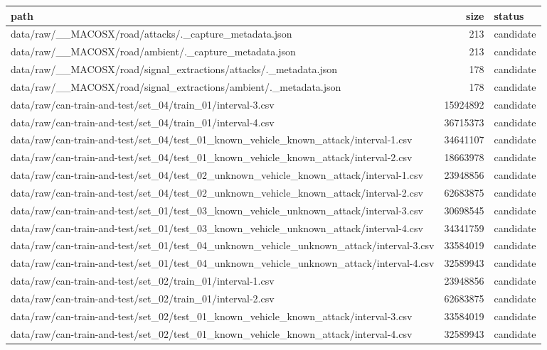 \begin{tabular}{lrl}
\toprule
path & size & status \\
\midrule
data/raw/\_\_MACOSX/road/attacks/.\_capture\_metadata.json & 213 & candidate \\
data/raw/\_\_MACOSX/road/ambient/.\_capture\_metadata.json & 213 & candidate \\
data/raw/\_\_MACOSX/road/signal\_extractions/attacks/.\_metadata.json & 178 & candidate \\
data/raw/\_\_MACOSX/road/signal\_extractions/ambient/.\_metadata.json & 178 & candidate \\
data/raw/can-train-and-test/set\_04/train\_01/interval-3.csv & 15924892 & candidate \\
data/raw/can-train-and-test/set\_04/train\_01/interval-4.csv & 36715373 & candidate \\
data/raw/can-train-and-test/set\_04/test\_01\_known\_vehicle\_known\_attack/interval-1.csv & 34641107 & candidate \\
data/raw/can-train-and-test/set\_04/test\_01\_known\_vehicle\_known\_attack/interval-2.csv & 18663978 & candidate \\
data/raw/can-train-and-test/set\_04/test\_02\_unknown\_vehicle\_known\_attack/interval-1.csv & 23948856 & candidate \\
data/raw/can-train-and-test/set\_04/test\_02\_unknown\_vehicle\_known\_attack/interval-2.csv & 62683875 & candidate \\
data/raw/can-train-and-test/set\_01/test\_03\_known\_vehicle\_unknown\_attack/interval-3.csv & 30698545 & candidate \\
data/raw/can-train-and-test/set\_01/test\_03\_known\_vehicle\_unknown\_attack/interval-4.csv & 34341759 & candidate \\
data/raw/can-train-and-test/set\_01/test\_04\_unknown\_vehicle\_unknown\_attack/interval-3.csv & 33584019 & candidate \\
data/raw/can-train-and-test/set\_01/test\_04\_unknown\_vehicle\_unknown\_attack/interval-4.csv & 32589943 & candidate \\
data/raw/can-train-and-test/set\_02/train\_01/interval-1.csv & 23948856 & candidate \\
data/raw/can-train-and-test/set\_02/train\_01/interval-2.csv & 62683875 & candidate \\
data/raw/can-train-and-test/set\_02/test\_01\_known\_vehicle\_known\_attack/interval-3.csv & 33584019 & candidate \\
data/raw/can-train-and-test/set\_02/test\_01\_known\_vehicle\_known\_attack/interval-4.csv & 32589943 & candidate \\

\end{tabular}
